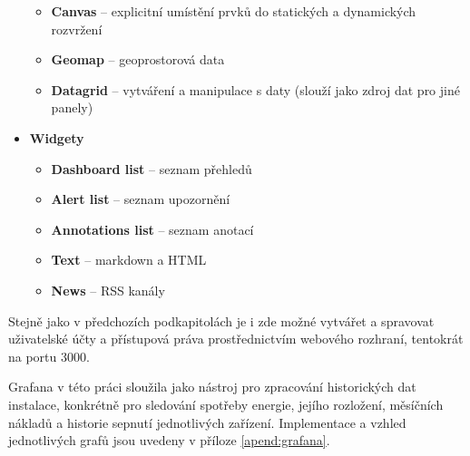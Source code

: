 \begin{itemize}
\begin{itemize}
        \item \textbf{Canvas} – explicitní umístění prvků do statických a dynamických rozvržení
        \item \textbf{Geomap} – geoprostorová data
        \item \textbf{Datagrid} – vytváření a manipulace s daty (slouží jako zdroj dat pro jiné panely)
    \end{itemize}
    \item \textbf{Widgety}
    \begin{itemize}
        \item \textbf{Dashboard list} – seznam přehledů
        \item \textbf{Alert list} – seznam upozornění
        \item \textbf{Annotations list} – seznam anotací
        \item \textbf{Text} – markdown a HTML
        \item \textbf{News} – RSS kanály \newline
    \end{itemize}
\end{itemize}
Stejně jako v předchozích podkapitolách je i zde možné vytvářet a spravovat uživatelské účty a přístupová práva prostřednictvím webového rozhraní, tentokrát na portu 3000.

Grafana v této práci sloužila jako nástroj pro zpracování historických dat instalace, konkrétně pro sledování spotřeby energie, jejího rozložení, měsíčních nákladů a historie sepnutí jednotlivých zařízení. Implementace a vzhled jednotlivých grafů jsou uvedeny v příloze \ref{apend:grafana}. 

